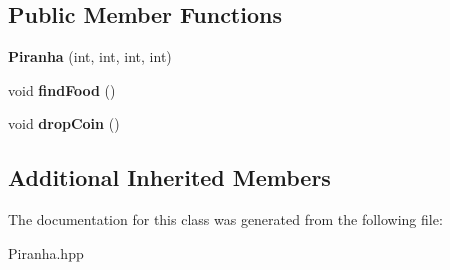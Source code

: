 \subsection*{Public Member Functions}
\begin{DoxyCompactItemize}
\item 
\mbox{\label{class_piranha_a51163ce0eb4f08fe46375b19055b4a13}} 
{\bfseries Piranha} (int, int, int, int)
\item 
\mbox{\label{class_piranha_a84231f6989880f186bf64e768e68289c}} 
void {\bfseries find\+Food} ()
\item 
\mbox{\label{class_piranha_aee107987f36631002f04c5283564382b}} 
void {\bfseries drop\+Coin} ()
\end{DoxyCompactItemize}
\subsection*{Additional Inherited Members}


The documentation for this class was generated from the following file\+:\begin{DoxyCompactItemize}
\item 
Piranha.\+hpp\end{DoxyCompactItemize}
